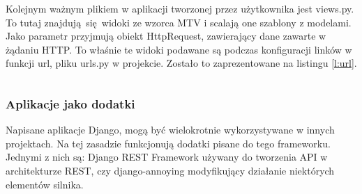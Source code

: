 Kolejnym ważnym plikiem w aplikacji tworzonej przez użytkownika jest views.py. To tutaj znajdują się widoki ze wzorca MTV i scalają one szablony z modelami. Jako parametr przyjmują obiekt HttpRequest, zawierający dane zawarte w żądaniu HTTP. To właśnie te widoki podawane są podczas konfiguracji linków w funkcji url, pliku urls.py w projekcie. Zostało to zaprezentowane na listingu \ref{l:url}.

\begin{singlespace}
	\vspace{0.3cm}
	\inputminted[fontsize=\footnotesize]{python}{src/views.py}
\end{singlespace}

\subsubsection*{Aplikacje jako dodatki}
Napisane aplikacje Django, mogą być wielokrotnie wykorzystywane w innych projektach. Na tej zasadzie funkcjonują dodatki pisane do tego frameworku. Jednymi z nich są: Django REST Framework używany do tworzenia API w architekturze REST, czy django-annoying modyfikujący działanie niektórych elementów silnika.

